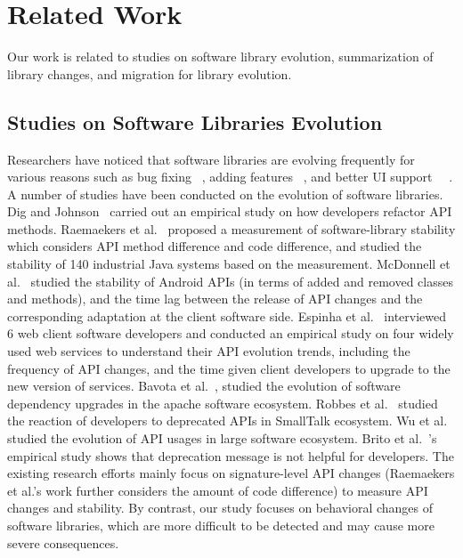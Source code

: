 

\section{Related Work}


\label{sec:related}
Our work is related to studies on software library evolution, summarization of library changes, and migration for library evolution.
 


\subsection{Studies on Software Libraries Evolution}


Researchers have noticed that software libraries are evolving frequently for various reasons such as bug fixing ~\cite{bugEvo}, adding features ~\cite{featureEvo}, and better
UI support~\cite{WangFSE12} ~\cite{WangFSE10}. A number of studies have been conducted on the evolution of software libraries. Dig and Johnson~\cite{Dig2006} carried out an empirical study on how developers refactor API methods. Raemaekers et al.~\cite{Raemaekers:APIStability} proposed a measurement of software-library stability which considers API method difference and code difference, and studied the stability of 140 industrial Java systems based on the measurement. McDonnell et al.~\cite{McDonnell:APIStability} studied the stability of Android APIs (in terms of added and removed classes and methods), and the time lag between the release of API changes and the corresponding adaptation at the client software side. Espinha et al.~\cite{Espinha:WebAPI} interviewed 6 web client software developers and conducted an empirical study on four widely used web services to understand their API evolution trends, including the frequency of API changes, and the time given client developers to upgrade to the new version of services. Bavota et al.~\cite{Bavota:upgrade,Bavota:upgradeJ}, studied the evolution of software dependency upgrades in the apache software ecosystem. Robbes et al.~\cite{Robbes} studied the reaction of developers to deprecated APIs in SmallTalk ecosystem. Wu et al.~\cite{Wu2015, Wu2016} studied the evolution of API usages in large software ecosystem. Brito et al.~\cite{Brito16}'s empirical study shows that deprecation message is not helpful for developers. The existing research efforts mainly focus on signature-level API changes (Raemaekers et al.'s work further considers the amount of code difference) to measure API changes and stability. By contrast, our study focuses on behavioral changes of software libraries, which are more difficult to be detected and may cause more severe consequences. 

